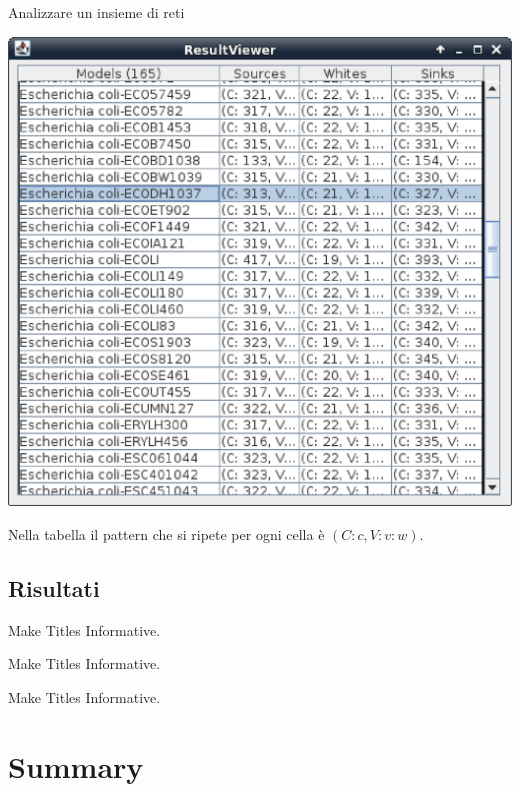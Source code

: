 \documentclass{beamer}
\begin{document}
\begin{frame}{Analizzare un insieme di reti}
  \begin{center}
    \includegraphics[scale=.2]{images/ResultViewer-Escherichia-family}
  \end{center}
Nella tabella il pattern che si ripete per ogni cella \`e $(C:c, V:v:w)$.
\end{frame}

\subsection{Risultati}

\begin{frame}{Make Titles Informative.}
\end{frame}

\begin{frame}{Make Titles Informative.}
\end{frame}

\begin{frame}{Make Titles Informative.}
\end{frame}


\section*{Summary}
\end{document}
